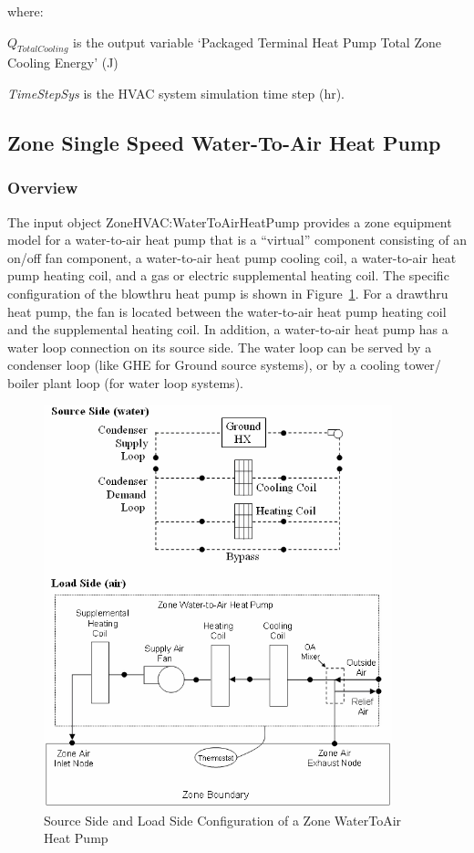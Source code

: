 where:

\(Q_{TotalCooling}\) is the output variable `Packaged Terminal Heat Pump Total Zone Cooling Energy' (J)

\emph{TimeStepSys} is the HVAC system simulation time step (hr).

\subsection{Zone Single Speed Water-To-Air Heat Pump}\label{zone-single-speed-water-to-air-heat-pump}

\subsubsection{Overview}\label{overview-8-001}

The input object ZoneHVAC:WaterToAirHeatPump provides a zone equipment model for a water-to-air heat pump that is a ``virtual'' component consisting of an on/off fan component, a water-to-air heat pump cooling coil, a water-to-air heat pump heating coil, and a gas or electric supplemental heating coil. The specific configuration of the blowthru heat pump is shown in Figure~\ref{fig:source-side-and-load-side-configuration-of-a-001}. For a drawthru heat pump, the fan is located between the water-to-air heat pump heating coil and the supplemental heating coil. In addition, a water-to-air heat pump has a water loop connection on its source side. The water loop can be served by a condenser loop (like GHE for Ground source systems), or by a cooling tower/ boiler plant loop (for water loop systems).

\begin{figure}[hbtp] %
\centering
\includegraphics[width=0.9\textwidth, height=0.9\textheight, keepaspectratio=true]{media/image7258.png}
\caption{Source Side and Load Side Configuration of a Zone WaterToAir Heat Pump \protect \label{fig:source-side-and-load-side-configuration-of-a-001}}
\end{figure}

